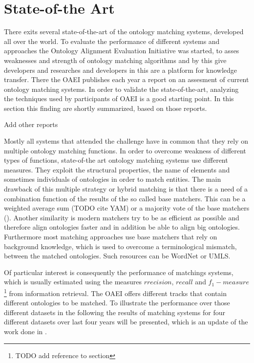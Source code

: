 \documentclass[11pt,titlepage,oneside,openany,a4paper]{report}
\begin{document}
\section{State-of-the Art}
\label{sec:state_of_the_art}
There exits several state-of-the-art of the ontology matching systems, developed all over the world. To evaluate the performance of different systems and approaches the Ontology Alignment Evaluation Initiative was started, to asses weaknesses and strength of ontology matching algorithms and by this give developers and researches and developers in this are a platform for knowledge transfer. \cite{Euzenat:2011aa} 
There the OAEI publishes each year a report on an assesment of current ontology matching systems. In order to validate the state-of-the-art, analyzing the techniques used by participants of OAEI is a good starting point. In this section this finding are shortly summarized, based on those reports. \cite{euzenat2014} 
\begin{Huge}
Add other reports
\end{Huge}
Mostly all systems that attended the challenge have in common that  they rely on multiple ontology matching functions. In order to overcome weakness of different types of functions, state-of-the art ontology matching systems use different measures. They exploit the structural properties, the name of elements and sometimes individuals of ontologies in order to match entities. The main drawback of this multiple strategy or hybrid matching is that there is a need of a combination function of the results of the so called base matchers. This can be a weighted average sum (TODO cite YAM) or a majority vote of the base matchers (\cite{Eckert:2009:IOM:1561533.1561553}). \cite{6104044}
Another similarity is modern matchers try to be as efficient as possible and therefore align ontologies faster and in addition be able to align big ontologies.\cite{Rahm:2011aa}
Furthermore most matching approaches use base matchers that rely on background knowledge, which is used to overcome a terminological mismatch, between the matched ontologies. Such resources can be WordNet \cite{fellbaum1998wordnet} or UMLS\cite{bodenreider2004unified}. \cite{Euzenat:2011aa} 

Of particular interest is consequently the performance of matchings systems, which is usually estimated using the measures $rrecision$, $recall$ and $f_1-measure$ \footnote{TODO add reference to section} from information retrieval. The OAEI offers different tracks that contain different ontologies to be matched. To illustrate the performance over those different datasets in the following the results of matching systems for four different datasets over last four years will be presented, which is an update of the work done in \cite{6104044}.
\end{document}
